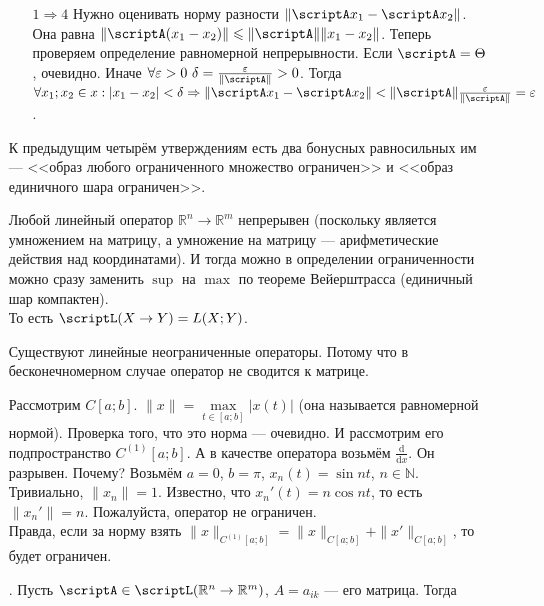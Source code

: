 \documentclass{article}
\begin{document}
\begin{itemize}
\begin{Proof}
\begin{itemize}
$$                $$
                \item[$1\Rightarrow4$] Нужно оценивать норму разности $\|\scriptA x_1-\scriptA x_2\|$. Она равна $\|\scriptA(x_1-x_2)\|\leqslant\|\scriptA\|\|x_1-x_2\|$. Теперь проверяем определение равномерной непрерывности. Если $\scriptA=\Theta$, очевидно. Иначе $\forall\varepsilon>0~\delta=\frac\varepsilon{\|\scriptA\|}>0$. Тогда $\forall x_1;x_2\in x:|x_1-x_2|<\delta\Rightarrow\|\scriptA x_1-\scriptA x_2\|<\|\scriptA\|\frac\varepsilon{\|\scriptA\|}=\varepsilon$.
            \end{itemize}
        \end{Proof}
        \begin{Comment}
            К предыдущим четырём утверждениям есть два бонусных равносильных им --- <<образ любого ограниченного множество ограничен>> и <<образ единичного шара ограничен>>.
        \end{Comment}
        \begin{Comment}
            Любой линейный оператор $\mathbb R^n\to\mathbb R^m$ непрерывен (поскольку является умножением на матрицу, а умножение на матрицу --- арифметические действия над координатами). И тогда можно в определении ограниченности можно сразу заменить $\sup$ на $\max$ по теореме Вейерштрасса (единичный шар компактен).\\
            То есть $\scriptL(X\to Y)=L(X;Y)$.
        \end{Comment}
        \begin{Comment}
            Существуют линейные неограниченные операторы. Потому что в бесконечномерном случае оператор не сводится к матрице.
            \begin{Example}
                Рассмотрим $C[a;b]$. $\|x\|=\max\limits_{t\in[a;b]}|x(t)|$ (она называется равномерной нормой). Проверка того, что это норма --- очевидно. И рассмотрим его подпространство $C^{(1)}[a;b]$. А в качестве оператора возьмём $\frac{\mathrm d}{\mathrm dx}$. Он разрывен. Почему? Возьмём $a=0$, $b=\pi$, $x_n(t)=\sin nt$, $n\in\mathbb N$. Тривиально, $\|x_n\|=1$. Известно, что $x_n'(t)=n\cos nt$, то есть $\|x_n'\|=n$. Пожалуйста, оператор не ограничен.\\
                Правда, если за норму взять $\|x\|_{C^{(1)}[a;b]}=\|x\|_{C[a;b]}+\|x'\|_{C[a;b]}$, то будет ограничен.
            \end{Example}
        \end{Comment}
        \thm {}. Пусть $\scriptA\in\scriptL(\mathbb R^n\to\mathbb R^m)$, $A=a_{ik}$ --- его матрица. Тогда

\end{itemize}
\end{document}
